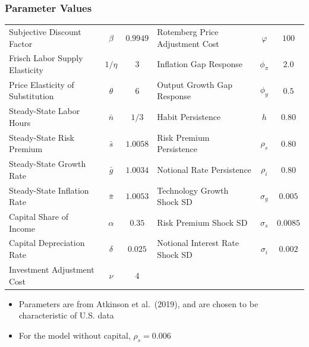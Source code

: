 \documentclass[11pt]{beamer}
\begin{document}
\begin{frame}\frametitle{Parameter Values}
\begin{table}[H]
\centering
\captionsetup{justification=centering}
  \scriptsize
    \setlength{\tabcolsep}{3pt}      
  \begin{tabular}{l c c |l  c c}
    \hline
  Subjective Discount Factor & $\beta$ & $0.9949$ & Rotemberg Price Adjustment Cost & $\varphi$ & $100$ \\
   Frisch Labor Supply Elasticity & $1/\eta$ & $3$ & Inflation Gap Response & $\phi_\pi$ & $2.0$ \\
  Price Elasticity of Substitution & $\theta$ & $6$ & Output Growth Gap Response & $\phi_y$ & $0.5$ \\
  Steady-State Labor Hours & $\bar{n}$ & $1/3$ & Habit Persistence & $h$ & $0.80$ \\
  Steady-State Risk Premium & $\bar{s}$ & $1.0058$ & Risk Premium Persistence & $\rho_s$ & $0.80$ \\
  Steady-State Growth Rate & $\bar{g}$ & $1.0034$ & Notional Rate Persistence & $\rho_i$ & $0.80$ \\
  Steady-State Inflation Rate & $\bar{\pi}$ & $1.0053$ & Technology Growth Shock SD & $\sigma_g$ & $0.005$ \\
  Capital Share of Income & $\alpha$ & $0.35$ & Risk Premium Shock SD & $\sigma_s$ & $0.0085$ \\
  Capital Depreciation Rate & $\delta$ & $0.025$ & Notional Interest Rate Shock SD & $\sigma_i$ & $0.002$ \\
  Investment Adjustment Cost & $\nu$ & $4$ & & &\\
  \hline
  \end{tabular}
\normalfont
\end{table}
\begin{itemize}\setlength{\itemsep}{8pt}
\item <2-|handout:1>Parameters are from Atkinson et al.\ (2019), and are chosen to be characteristic of U.S. data
\item <3-|handout:1>For the model without capital, $\rho_s = 0.006$ %
\end{itemize}
\end{frame}
\end{document}

